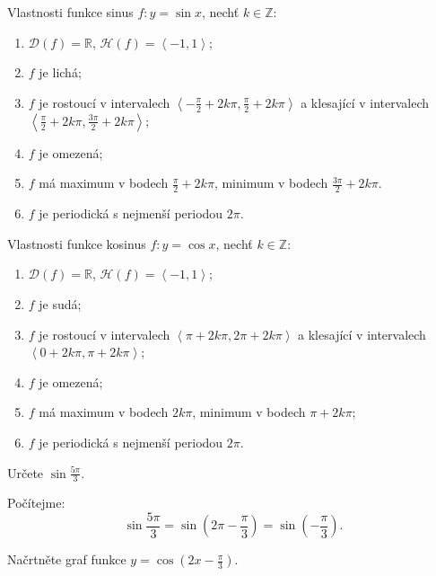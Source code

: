 \begin{veta}
    Vlastnosti funkce sinus $f\colon y = \sin x$, nechť $k\in \mathbb Z$:
    \begin{enumerate}[$i.$]
        \item $\mathcal D(f)= \mathbb R$, $\mathcal H(f)= \left<  -1,1 \right> $;
       	\item $f$ je lichá;
        \item $f$ je rostoucí v intervalech $\left<  -\frac{\pi}{2}+2k\pi, \frac{\pi}{2}+2k\pi \right> $ a klesající v intervalech $\left<  \frac{\pi}{2}+2k\pi, \frac{3\pi}{2}+2k\pi \right> $;
        \item $f$ je omezená;
        \item $f$ má maximum v bodech $\frac{\pi}{2}+2k\pi$, minimum v bodech $\frac{3\pi}{2}+2k\pi.$
        \item $f$ je periodická s nejmenší periodou $2\pi$.
    \end{enumerate}
    Vlastnosti funkce kosinus $f\colon y = \cos x$, nechť $k \in \mathbb Z$:
    \begin{enumerate}[$i.$]
        \item $\mathcal D(f)= \mathbb R$, $\mathcal H(f)= \left<  -1,1 \right> $;
       	\item $f$ je sudá;
        \item $f$ je rostoucí v intervalech $\left<  \pi+2k\pi, 2\pi+2k\pi \right> $ a klesající v intervalech $\left<  0+2k\pi, \pi+2k\pi \right> $;
        \item $f$ je omezená;
        \item $f$ má maximum v bodech $2k\pi$, minimum v bodech $\pi+2k\pi$;
        \item $f$ je periodická s nejmenší periodou $2\pi$.
    \end{enumerate}
\end{veta}

\begin{priklad}
Určete $\sin \frac{5\pi}{3}.$
\end{priklad}

\begin{reseni}
Počítejme:
$$\sin \frac{5\pi}{3}=\sin \left ( 2\pi-\frac{\pi}{3} \right ) =\sin \left ( -\frac{\pi}{3} \right ). $$
\end{reseni}

\begin{priklad}
Načrtněte graf funkce $y=\cos (2x-\frac{\pi}{3}).$
\end{priklad}

